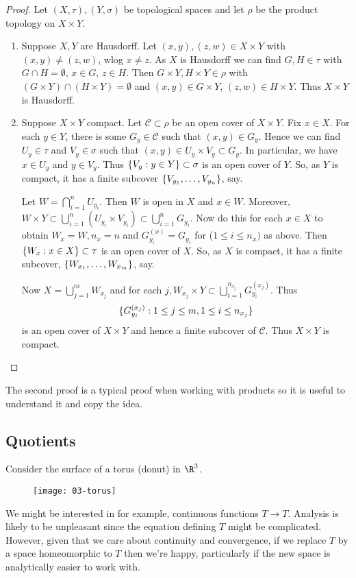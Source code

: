 \begin{proof}
Let $(X,\tau), (Y,\sigma)$ be topological spaces and let $\rho$ be the product topology on $X\times Y$.
\begin{enumerate}
    \item Suppose $X,Y$ are Hausdorff. Let $(x,y), (z,w)\in X\times Y$ with $(x,y)\neq (z,w)$, wlog $x\neq z$. As $X$ is Hausdorff we can find $G,H\in \tau$ with $G\cap H = \emptyset$, $x\in G$, $z\in H$. Then $G\times Y, H\times Y\in \rho$ with $(G\times Y)\cap (H\times Y) = \emptyset$ and $(x,y)\in G\times Y$, $(z,w) \in H\times Y$. Thus $X\times Y$ is Hausdorff.
    \item Suppose $X\times Y$ compact. Let $\mathcal{C}\subset\rho$ be an open cover of $X\times Y$. Fix $x \in X$. For each $y\in Y$, there is some $G_y\in \mathcal{C}$ such that $(x,y)\in G_y$. Hence we can find $U_y\in \tau$ and $V_y\in \sigma$ such that $(x,y)\in U_y\times V_y\subset G_y$. In particular, we have $x\in U_y$ and $y\in V_y$. Thus $\{V_y : y\in Y\}\subset \sigma$ is an open cover of $Y$. So, as $Y$ is compact, it has a finite subcover $\{V_{y_1},\dots, V_{y_n}\}$, say.

    Let $W = \bigcap_{i=1}^n U_{y_i}$. Then $W$ is open in $X$ and $x\in W$. Moreover, $W\times Y \subset \bigcup_{i=1}^n (U_{y_i}\times V_{y_i}) \subset \bigcup_{i=1}^n G_{y_i}$. Now do this for each $x\in X$ to obtain $W_x = W, n_x = n$ and $G_{y_i}^{(x)} = G_{y_i}$ for ($1 \leq i  \leq n_x)$ as above. Then $\{W_x : x\in X\}\subset \tau$ is an open cover of $X$. So, as $X$ is compact, it has a finite subcover, $\{W_{x_1},\dots , W_{x_m}\}$, say.

    Now $X = \bigcup_{j=1}^m W_{x_j}$ and for each $j, W_{x_j}\times Y\subset \bigcup_{i=1}^{n_{x_j}} G_{y_i}^{(x_j)}$. Thus \[\{G_{y_i}^{(x_j)} : 1 \leq j \leq m, 1 \leq i \leq n_{x_j}\}\] is an open cover of $X\times Y$ and hence a finite subcover of $\mathcal{C}$. Thus $X\times Y$ is compact.
\end{enumerate}
\end{proof}

\begin{remark}
    The second proof is a typical proof when working with products so it is useful to understand it and copy the idea.
\end{remark}

\subsection{Quotients}
Consider the surface of a torus (donut) in $\R^3$.
\begin{figure}[h]
    \centering
    \texttt{[image: 03-torus]}
\end{figure}
We might be interested in for example, continuous functions $T\to T$. Analysis is likely to be unpleasant since the equation defining $T$ might be complicated. However, given that we care about continuity and convergence, if we replace $T$ by a space homeomorphic to $T$ then we're happy, particularly if the new space is analytically easier to work with.


